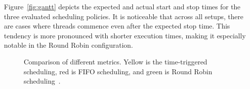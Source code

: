 

    
    
    
    
    Figure~\ref{fig:gantt} depicts the expected and actual start and stop times for the three evaluated scheduling policies. It is noticeable that across all setups, there are cases where threads commence even after the expected stop time. This tendency is more pronounced with shorter execution times, making it especially notable in the Round Robin configuration.



    \begin{figure}[t!]
	\centering
	\caption{Comparison of different metrics. Yellow is the time-triggered scheduling, red is FIFO scheduling, and green is Round Robin scheduling~\cite{askaripoor2023designer}.}
	\label{fig:metrics}
    \end{figure}
    
